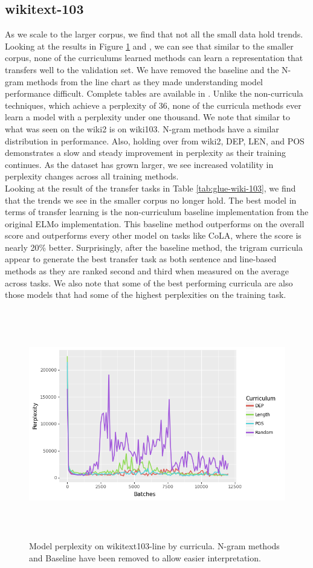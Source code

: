 \subsection{wikitext-103}
As we scale to the larger corpus, we find that not all the small data hold trends. Looking at the results in Figure \ref{fig:wikitext-103-line} and , we can see that similar to the smaller corpus, none of the curriculums learned methods can learn a representation that transfers well to the validation set. We have removed the baseline and the N-gram methods from the line chart as they made understanding model performance difficult. Complete tables are available in . Unlike the non-curricula techniques, which achieve a perplexity of 36, none of the curricula methods ever learn a model with a perplexity under one thousand. We note that similar to what was seen on the wiki2 is on wiki103. N-gram methods have a similar distribution in performance. Also, holding over from wiki2, DEP, LEN, and POS demonstrates a slow and steady improvement in perplexity as their training continues. As the dataset has grown larger, we see increased volatility in perplexity changes across all training methods.\\
Looking at the result of the transfer tasks in Table \ref{tab:glue-wiki-103}, we find that the trends we see in the smaller corpus no longer hold. The best model in terms of transfer learning is the non-curriculum baseline implementation from the original ELMo implementation. This baseline method outperforms on the overall score and outperforms every other model on tasks like CoLA, where the score is nearly 20\% better. Surprisingly, after the baseline method, the trigram curricula appear to generate the best transfer task as both sentence and line-based methods as they are ranked second and third when measured on the average across tasks. We also note that some of the best performing curricula are also those models that had some of the highest perplexities on the training task.
\begin{figure}[H]
\centering
\label{fig:wikitext-103-line}
\includegraphics[height=10cm]{Thesis/images/wikitext-103lineminusbigrambaselinetrigramunigram.png}
\caption{Model perplexity on wikitext103-line by curricula. N-gram methods and Baseline have been removed to allow easier interpretation.}
\end{figure}
